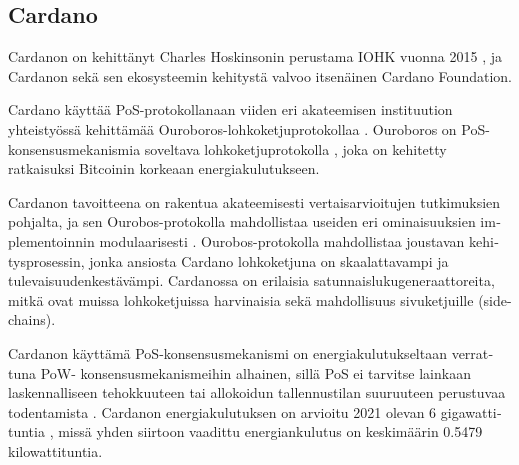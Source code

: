 \subsection{Cardano\label{cardano}}
\begin{otherlanguage}{english}

Cardanon on kehittänyt Charles Hoskinsonin perustama IOHK vuonna 2015 \cite{cardanowhitepaper, iohk}, ja Cardanon sekä sen ekosysteemin kehitystä valvoo itsenäinen Cardano Foundation. 

Cardano käyttää PoS-protokollanaan viiden eri akateemisen instituution yhteistyössä kehittämää Ouroboros-lohkoketjuprotokollaa \cite{cardanowhitepaper}. Ouroboros on PoS-konsensusmekanismia soveltava lohkoketjuprotokolla \cite{cardano-ouroboros}, joka on kehitetty ratkaisuksi Bitcoinin korkeaan energiakulutukseen.

Cardanon tavoitteena on rakentua akateemisesti vertaisarvioitujen tutkimuksien pohjalta, ja sen Ourobos-protokolla mahdollistaa useiden eri ominaisuuksien implementoinnin modulaarisesti \cite{cardanowhitepaper}. Ourobos-protokolla mahdollistaa joustavan kehitysprosessin, jonka ansiosta Cardano lohkoketjuna on skaalattavampi ja tulevaisuudenkestävämpi. Cardanossa on erilaisia satunnaislukugeneraattoreita, mitkä ovat muissa lohkoketjuissa harvinaisia sekä mahdollisuus sivuketjuille (side-chains).

Cardanon käyttämä PoS-konsensusmekanismi on energiakulutukseltaan verrattuna PoW- konsensusmekanismeihin alhainen, sillä PoS ei tarvitse lainkaan laskennalliseen tehokkuuteen tai allokoidun tallennustilan suuruuteen perustuvaa todentamista \cite{cardanowhitepaper}. Cardanon energiakulutuksen on arvioitu 2021 olevan 6 gigawattituntia \cite{cardanoenergy}, missä yhden siirtoon vaadittu energiankulutus on keskimäärin 0.5479 kilowattituntia.

\end{otherlanguage}